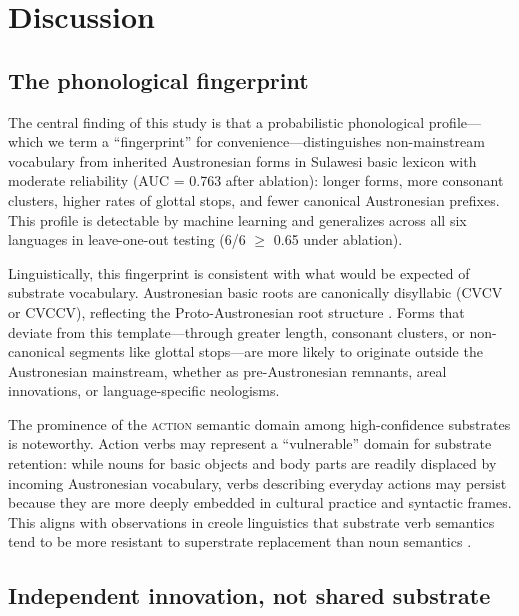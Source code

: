 \documentclass[12pt]{article}
\begin{document}
\section{Discussion}

\subsection{The phonological fingerprint}

The central finding of this study is that a probabilistic phonological profile---which we term a ``fingerprint'' for convenience---distinguishes non-mainstream vocabulary from inherited Austronesian forms in Sulawesi basic lexicon with moderate reliability (AUC = 0.763 after ablation): longer forms, more consonant clusters, higher rates of glottal stops, and fewer canonical Austronesian prefixes.
This profile is detectable by machine learning and generalizes across all six languages in leave-one-out testing (6/6 $\geq$ 0.65 under ablation).

Linguistically, this fingerprint is consistent with what would be expected of substrate vocabulary.
Austronesian basic roots are canonically disyllabic (CVCV or CVCCV), reflecting the Proto-Austronesian root structure \citep{blust2009}.
Forms that deviate from this template---through greater length, consonant clusters, or non-canonical segments like glottal stops---are more likely to originate outside the Austronesian mainstream, whether as pre-Austronesian remnants, areal innovations, or language-specific neologisms.

The prominence of the \textsc{action} semantic domain among high-confidence substrates is noteworthy.
Action verbs may represent a ``vulnerable'' domain for substrate retention: while nouns for basic objects and body parts are readily displaced by incoming Austronesian vocabulary, verbs describing everyday actions may persist because they are more deeply embedded in cultural practice and syntactic frames.
This aligns with observations in creole linguistics that substrate verb semantics tend to be more resistant to superstrate replacement than noun semantics \citep{lefebvre2004, thomason1988}.

\subsection{Independent innovation, not shared substrate}
\end{document}
